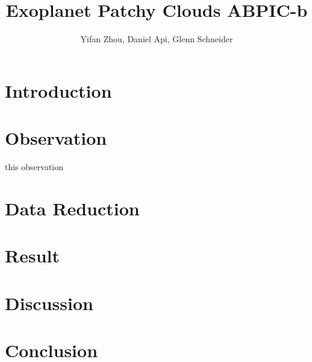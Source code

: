 \message{ !name(abpic.tex)}\documentclass{aastex}
\begin{document}

\title{Exoplanet Patchy Clouds ABPIC-b}
\author{Yifan Zhou, Daniel Api, Glenn Schneider}
\section{Introduction}
\section{Observation}
this observation
\section{Data Reduction}
\section{Result}
\section{Discussion}
\section{Conclusion}
\end{document}
